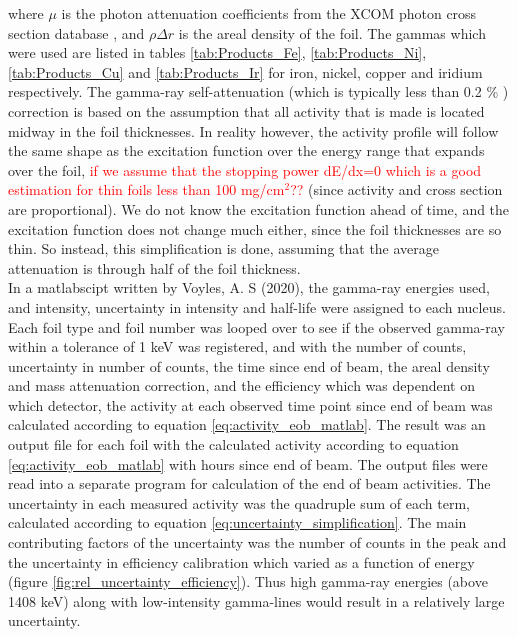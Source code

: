 where $\mu$ is the photon attenuation coefficients from the XCOM photon cross section database \cite{M.J.BergerJ.H.HubbellS.M.SeltzerJ.ChangJ.S.CourseyR.SukumarD.S.Zucker2010}%
, and $\rho\Delta r$ is the areal density of the foil. The gammas which were used are listed in tables \ref{tab:Products_Fe}, \ref{tab:Products_Ni}, \ref{tab:Products_Cu} and \ref{tab:Products_Ir} for iron, nickel, copper and iridium respectively. The gamma-ray self-attenuation (which is typically less than 0.2 \% \cite{Voyles2019}) correction is based on the assumption that all activity that is made is located midway in the foil thicknesses. In reality however, the activity profile will follow the same shape as the excitation function over the energy range that expands over the foil, \textcolor{red}{if we assume that the stopping power dE/dx=0 which is a good estimation for thin foils less than 100 mg/cm$^2$??} (since activity and cross section are proportional). We do not know the excitation function ahead of time, and the excitation function does not change much either, since the foil thicknesses are so thin. So instead, this simplification is done, assuming that the average attenuation is through half of the foil thickness. \\ 

In a matlabscipt written by Voyles, A. S (2020), the gamma-ray energies used, and intensity, uncertainty in intensity and half-life were assigned to each nucleus. Each foil type and foil number was looped over to see if the observed gamma-ray within a tolerance of 1 keV was registered, and with the number of counts, uncertainty in number of counts, the time since end of beam, the areal density and mass attenuation correction, and the efficiency which was dependent on which detector, the activity at each observed time point since end of beam was calculated according to equation \ref{eq:activity_eob_matlab}. The result was an output file for each foil with the calculated activity according to equation \ref{eq:activity_eob_matlab} with hours since end of beam. The output files were read into a separate program for calculation of the end of beam activities. The uncertainty in each measured activity was the quadruple sum of each term, calculated according to equation \ref{eq:uncertainty_simplification}. The main contributing factors of the uncertainty was the number of counts in the peak and the uncertainty in efficiency calibration which varied as a function of energy (figure \ref{fig:rel_uncertainty_efficiency}). Thus high gamma-ray energies (above 1408 keV) along with low-intensity gamma-lines would result in a relatively large uncertainty.  \\ %


